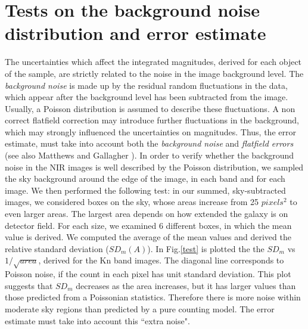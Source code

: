 \documentclass{aa}
\begin{document}
\appendix
\section{Tests on the background noise distribution and error estimate}
\label{error}
The uncertainties which affect the integrated magnitudes, derived for each 
object of the sample, are strictly related to the noise in the image 
background level. The {\it background noise} is made up by the residual random 
fluctuations in the data, which appear after the background level has been 
subtracted from the image.
Usually, a Poisson distribution is assumed to describe these fluctuations.
A non correct flatfield correction may introduce further fluctuations in the
background, which may strongly influenced the uncertainties on magnitudes.
Thus, the error estimate, must take into account both the
{\it background noise} and {\it flatfield errors} (see also Matthews and Gallagher 
\cite{MG97}).
In order to verify whether the background noise in the NIR images is well 
described by the Poisson distribution, we sampled the
sky background around the edge of the image, in each band and for each image.
We then performed the following test: in our summed, sky-subtracted images,
we considered boxes on the sky, whose areas increase from 25 $pixels^2$ to even 
larger areas. The largest area depends on how extended the galaxy is on detector field.
For each size, we examined 6 different boxes, in which the mean 
value is derived. We computed the average of
the mean values and derived the relative standard deviation ($SD_m(A)$).
In Fig.\ref{test} is plotted the the $SD_m$ vs $1/\sqrt{area}$, 
derived for the Kn band images.
The diagonal line corresponds to Poisson noise, if the count in each
pixel has unit standard deviation.
This plot suggests that $SD_m$ decreases
as the area increases, but it has larger values than those predicted from
a Poissonian statistics. 
Therefore there is more noise within moderate sky regions
than predicted by a pure counting model. The error estimate must take
into account this ``extra noise".
\end{document}
